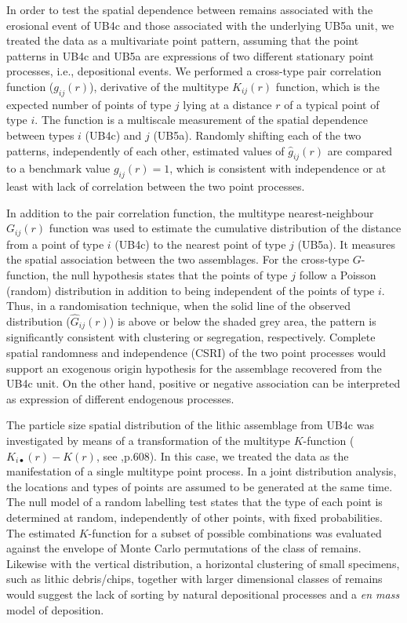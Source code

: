 \documentclass[review,authoryear,times]{elsarticle} %
\begin{document}
In order to test the spatial dependence between remains associated with the erosional event of UB4c and those associated with the underlying UB5a unit, we treated the data as a multivariate point pattern, assuming that the point patterns in UB4c and UB5a are expressions of two different stationary point processes, i.e., depositional events. We performed a cross-type pair correlation function ($g_{ij}(r)$), derivative of the multitype $K_{ij}(r)$ function, which is the expected number of points of type $j$ lying at a distance $r$ of a typical point of type $i$. The function is a multiscale measurement of the spatial dependence between types $i$ (UB4c) and $j$ (UB5a). Randomly shifting each of the two patterns, independently of each other, estimated values of $\hat{g}_{ij}(r)$ are compared to a benchmark value $g_{ij}(r)=1$, which is consistent with independence or at least with lack of correlation between the two point processes.

In addition to the pair correlation function, the multitype nearest-neighbour $G_{ij}(r)$ function was used to estimate the cumulative distribution of the distance from a point of type $i$ (UB4c) to the nearest point of type $j$ (UB5a). It measures the spatial association between the two assemblages. For the cross-type $G$-function, the null hypothesis states that the points of type $j$ follow a Poisson (random) distribution in addition to being independent of the points of type $i$. Thus, in a randomisation technique, when the solid line of the observed distribution ($\hat{G}_{ij}(r)$) is above or below the shaded grey area, the pattern is significantly consistent with clustering or segregation, respectively. Complete spatial randomness and independence (CSRI) of the two point processes would support an exogenous origin hypothesis for the assemblage recovered from the UB4c unit. On the other hand, positive or negative association can be interpreted as expression of different endogenous processes.

The particle size spatial distribution of the lithic assemblage from UB4c was investigated by means of a transformation of the multitype $K$-function ($K_{i\bullet}(r)-K(r)$, see \cite{spatstatBook},p.608). In this case, we treated the data as the manifestation of a single multitype point process. In a joint distribution analysis, the locations and types of points are assumed to be generated at the same time. The null model of a random labelling test states that the type of each point is determined at random, independently of other points, with fixed probabilities. The estimated $K$-function for a subset of possible combinations was evaluated against the envelope of Monte Carlo permutations of the class of remains. Likewise with the vertical distribution, a horizontal clustering of small specimens, such as lithic debris/chips, together with larger dimensional classes of remains would suggest the lack of sorting by natural depositional processes and a \emph{en mass} model of deposition.
\end{document}
